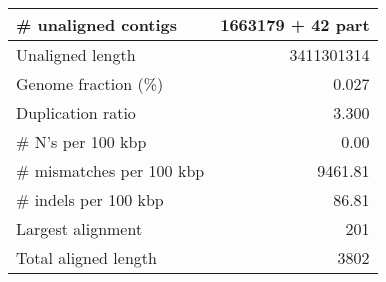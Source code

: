 \documentclass[12pt,a4paper]{article}
\begin{document}
\begin{table}[ht]
\begin{center}
\begin{tabular}{|l*{1}{|r}|}
\# unaligned contigs & 1663179 + 42 part \\ \hline
Unaligned length & 3411301314 \\ \hline
Genome fraction (\%) & 0.027 \\ \hline
Duplication ratio & 3.300 \\ \hline
\# N's per 100 kbp & 0.00 \\ \hline
\# mismatches per 100 kbp & 9461.81 \\ \hline
\# indels per 100 kbp & 86.81 \\ \hline
Largest alignment & 201 \\ \hline
Total aligned length & 3802 \\ \hline
\end{tabular}
\end{center}
\end{table}
\end{document}
